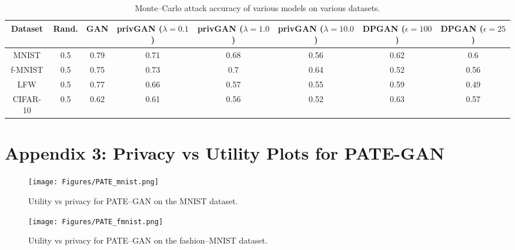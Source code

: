 \documentclass{article}
\begin{document}
\begin{table*}[h!]
\small
\begin{center}
\begin{tabular}{ c|c|c|c|c|c|c|c } 
 \hline
 Dataset & Rand. & GAN & privGAN ($\lambda=0.1$) & privGAN ($\lambda=1.0$) & privGAN ($\lambda=10.0$)  & DPGAN ($\epsilon=100$) & DPGAN ($\epsilon=25$)
 \\ \hline
 MNIST  & 0.5 & 0.79 & 0.71 & 0.68 & 0.56 & 0.62 & 0.6\\ 
 f-MNIST  & 0.5 & 0.75 & 0.73 & 0.7  & 0.64 & 0.52 & 0.56\\
 LFW & 0.5 & 0.77 & 0.66 & 0.57 & 0.55 & 0.59 & 0.49\\ 
 CIFAR-10 & 0.5 & 0.62 & 0.61 & 0.56 & 0.52 & 0.63 & 0.57\\
 \hline
\end{tabular}
\end{center}
 \caption{Monte--Carlo attack accuracy of various models on various datasets.}
 \label{SuppTable3}
\end{table*}

\section*{Appendix 3: Privacy vs Utility Plots for PATE-GAN}
\begin{figure}[h!]
    \centering
    \texttt{[image: Figures/PATE\_mnist.png]}
    \caption{Utility vs privacy for PATE--GAN on the MNIST dataset.}
    \label{pate-mnist}
\end{figure}

\begin{figure}[h!]
    \centering
    \texttt{[image: Figures/PATE\_fmnist.png]}
    \caption{Utility vs privacy for PATE--GAN on the fashion--MNIST dataset.}
    \label{pate-fmnist}
\end{figure}
\end{document}
